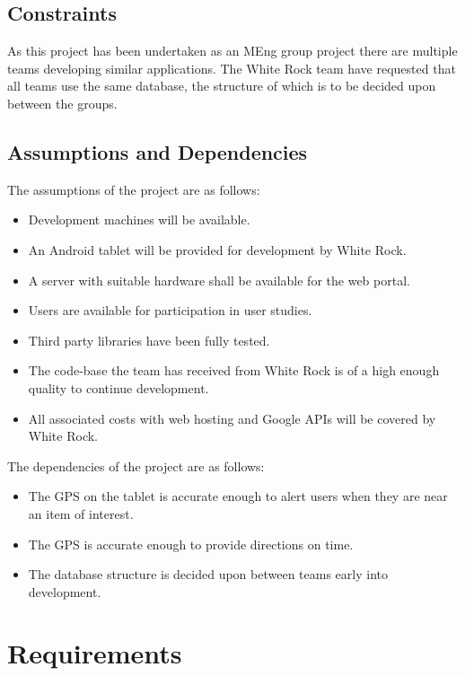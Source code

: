 \documentclass[11pt,a4paper]{article}
\begin{document}
\subsection{Constraints}
\label{sec:constraints}
As this project has been undertaken as an MEng group project there are multiple teams developing similar applications. The White Rock team have requested that all teams use the same database, the structure of which is to be decided upon between the groups.

\subsection{Assumptions and Dependencies}
\label{sec:assumptions-dependencies}
The assumptions of the project are as follows:

\begin{itemize}
\item Development machines will be available.
\item An Android tablet will be provided for development by White Rock.
\item A server with suitable hardware shall be available for the web portal.
\item Users are available for participation in user studies.
\item Third party libraries have been fully tested.
\item The code-base the team has received from White Rock is of a high enough quality to continue development.
\item All associated costs with web hosting and Google APIs will be covered by White Rock.
\end{itemize}
The dependencies of the project are as follows:
\begin{itemize}
\item The GPS on the tablet is accurate enough to alert users when they are near an item of interest.
\item The GPS is accurate enough to provide directions on time.
\item The database structure is decided upon between teams early into development.
\end{itemize}

\section{Requirements}
\label{sec:requirements}
\end{document}
